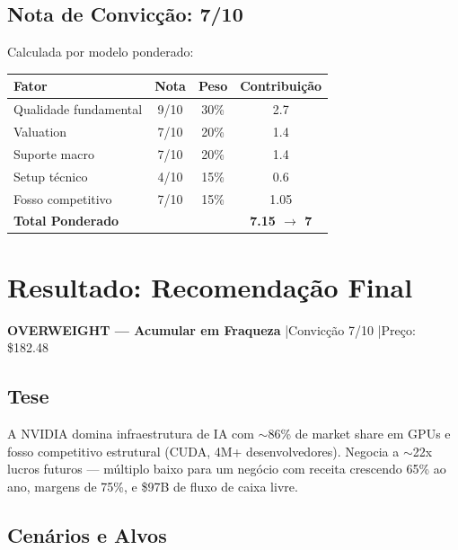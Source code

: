 \documentclass[11pt,a4paper]{article}
\begin{document}
\subsection{Nota de Convic\c{c}\~ao: 7/10}

Calculada por modelo ponderado:

\begin{table}[h]
\centering
\begin{tabular}{lccc}
\toprule
\textbf{Fator} & \textbf{Nota} & \textbf{Peso} & \textbf{Contribui\c{c}\~ao} \\
\midrule
Qualidade fundamental & 9/10 & 30\% & 2.7 \\
Valuation & 7/10 & 20\% & 1.4 \\
Suporte macro & 7/10 & 20\% & 1.4 \\
Setup t\'ecnico & 4/10 & 15\% & 0.6 \\
Fosso competitivo & 7/10 & 15\% & 1.05 \\
\midrule
\textbf{Total Ponderado} & & & \textbf{7.15 $\rightarrow$ 7} \\
\bottomrule
\end{tabular}
\end{table}

\newpage


\section{Resultado: Recomenda\c{c}\~ao Final}

\begin{center}
\large\textbf{OVERWEIGHT --- Acumular em Fraqueza} \quad|\quad Convic\c{c}\~ao 7/10 \quad|\quad Pre\c{c}o: \$182.48
\end{center}

\subsection{Tese}

A NVIDIA domina infraestrutura de IA com $\sim$86\% de market share em GPUs e fosso competitivo estrutural (CUDA, 4M+ desenvolvedores). Negocia a $\sim$22x lucros futuros --- m\'ultiplo baixo para um neg\'ocio com receita crescendo 65\% ao ano, margens de 75\%, e \$97B de fluxo de caixa livre.

\subsection{Cen\'arios e Alvos}
\end{document}

